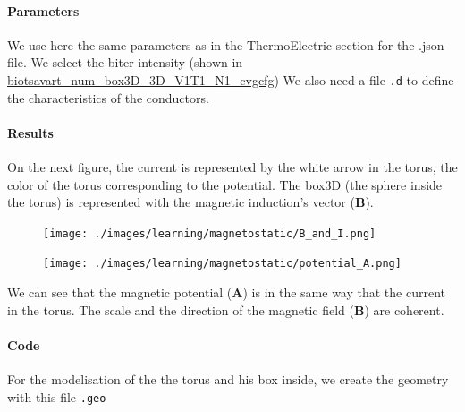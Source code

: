 \documentclass[11pt]{amsart}
\begin{document}
\hypertarget{x-parameters}{\paragraph{Parameters}}
We use here the same parameters as in the ThermoElectric section for the .json file.
We select the biter-intensity (shown in \hyperlink{example.cfg}{biotsavart\_num\_box3D\_3D\_V1T1\_N1\_cvgcfg})
We also need a file \texttt{.d} to define the characteristics of the conductors.


\hypertarget{x-results}{\paragraph{Results}}
On the next figure, the current is represented by the white arrow in the torus, the color of the torus corresponding to the potential.
The box3D (the sphere inside the torus) is represented with the magnetic induction’s vector (\textbf{B}).


\begin{figure}[h]{}
\centering\texttt{[image: ./images/learning/magnetostatic/B\_and\_I.png]}

\centering
\end{figure}

\begin{figure}[h]{}
\centering\texttt{[image: ./images/learning/magnetostatic/potential\_A.png]}

\centering
\end{figure}

We can see that the magnetic potential (\textbf{A}) is in the same way that the current in the torus.
The scale and the direction of the magnetic field (\textbf{B}) are coherent.


\hypertarget{x-code}{\paragraph{Code}}
For the modelisation of the the torus and his box inside, we create the geometry with this file \texttt{.geo}
\end{document}
